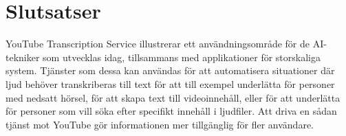\chapter{Slutsatser}
YouTube Transcription Service illustrerar ett användningsområde för
de AI-tekniker som utvecklas idag, tillsammans med applikationer för
storskaliga system. Tjänster som dessa kan användas för att automatisera
situationer där ljud behöver transkriberas till text för att till exempel
underlätta för personer med nedsatt hörsel, för att skapa text till
videoinnehåll, eller för att underlätta för personer som vill söka
efter specifikt innehåll i ljudfiler. Att driva en sådan tjänst mot YouTube
gör informationen mer tillgänglig för fler användare.
